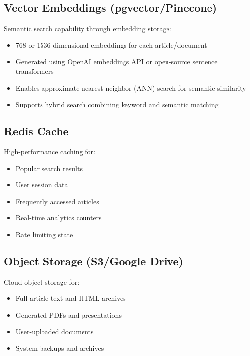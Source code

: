 \documentclass[12pt,a4paper]{report}
\begin{document}
\subsection{Vector Embeddings (pgvector/Pinecone)}

Semantic search capability through embedding storage:

\begin{itemize}[label=\textbullet]
    \item 768 or 1536-dimensional embeddings for each article/document
    \item Generated using OpenAI embeddings API or open-source sentence transformers
    \item Enables approximate nearest neighbor (ANN) search for semantic similarity
    \item Supports hybrid search combining keyword and semantic matching
\end{itemize}

\subsection{Redis Cache}

High-performance caching for:

\begin{itemize}[label=\textbullet]
    \item Popular search results
    \item User session data
    \item Frequently accessed articles
    \item Real-time analytics counters
    \item Rate limiting state
\end{itemize}

\subsection{Object Storage (S3/Google Drive)}

Cloud object storage for:

\begin{itemize}[label=\textbullet]
    \item Full article text and HTML archives
    \item Generated PDFs and presentations
    \item User-uploaded documents
    \item System backups and archives
\end{itemize}
\end{document}
